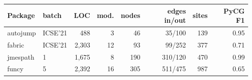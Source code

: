 \begin{tabular}{l l r r r r r r}
\toprule
Package & batch & LOC & mod. & nodes & edges in/out & sites & PyCG F1\\
\midrule
autojump & ICSE'21 & 488 & 3 & 46 & 35/100 & 139 & 0.95 \\
fabric & ICSE'21 & 2,303 & 12 & 93 & 99/252 & 377 & 0.71 \\
jmespath & 1 & 1,675 & 8 & 190 & 310/120 & 470 & 0.99 \\
funcy & 5 & 2,392 & 16 & 305 & 511/475 & 987 & 0.65 \\
\bottomrule
\end{tabular}
